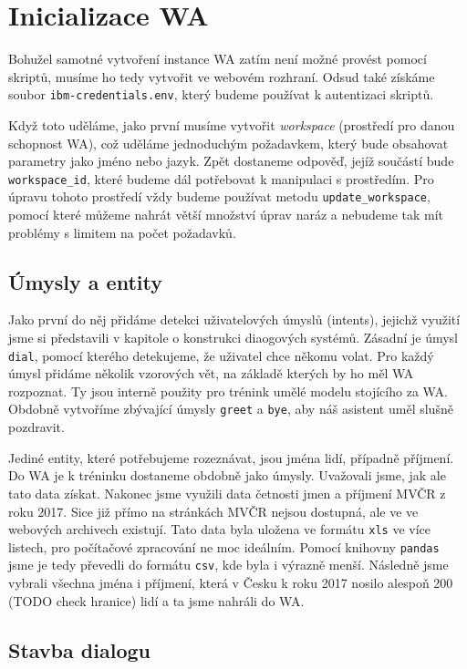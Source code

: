 \section{Inicializace WA}

Bohužel samotné vytvoření instance WA zatím není možné provést pomocí skriptů,
musíme ho tedy vytvořit ve webovém rozhraní. Odsud také získáme soubor
\texttt{ibm-credentials.env}, který budeme používat k autentizaci skriptů.

Když toto uděláme, jako první musíme vytvořit \textit{workspace}
(prostředí pro danou schopnost WA), což uděláme
jednoduchým požadavkem, který bude obsahovat parametry jako jméno nebo jazyk.
Zpět dostaneme odpověď, jejíž součástí bude \texttt{workspace\_id}, které budeme
dál potřebovat k manipulaci s prostředím. Pro úpravu tohoto prostředí
vždy budeme používat metodu \texttt{update\_workspace}, pomocí které můžeme
nahrát větší množství úprav naráz a nebudeme tak mít problémy s limitem na
počet požadavků.

\subsection{Úmysly a entity}

Jako první do něj přidáme detekci uživatelových úmyslů (intents), jejichž využití
jsme si představili v kapitole o konstrukci diaogových systémů. Zásadní je úmysl
\texttt{dial}, pomocí kterého detekujeme, že uživatel chce někomu volat. Pro
každý úmysl přidáme několik vzorových vět, na základě kterých by ho měl WA
rozpoznat. Ty jsou interně použity pro trénink umělé modelu stojícího za WA.
Obdobně vytvoříme zbývající úmysly \texttt{greet} a \texttt{bye}, aby náš
asistent uměl slušně pozdravit.

Jediné entity, které potřebujeme rozeznávat, jsou jména lidí, případně příjmení.
Do WA je k tréninku dostaneme obdobně jako úmysly. Uvažovali jsme, jak ale tato
data získat. Nakonec jsme využili data četnosti jmen a příjmení MVČR z roku 2017.
Sice již přímo na stránkách MVČR nejsou dostupná, ale ve ve webových archivech
existují. Tato data byla uložena ve formátu \texttt{xls} ve více listech, pro
počítačové zpracování ne moc ideálním. Pomocí knihovny \texttt{pandas} jsme je
tedy převedli do formátu \texttt{csv}, kde byla i výrazně menší. Následně jsme
vybrali všechna jména i příjmení, která v Česku k roku 2017 nosilo alespoň
200 (TODO check hranice) lidí a ta jsme nahráli do WA.

\subsection{Stavba dialogu}

